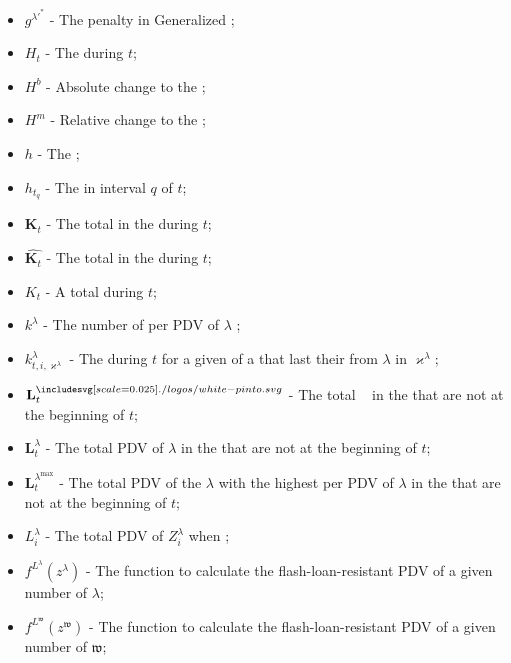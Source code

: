 \documentclass[class=article, crop=false]{standalone}
\begin{document}
\begin{itemize}[topsep=0pt, itemsep=3pt,leftmargin=16pt]
    \item[] $g^{\lambda'^{*}}$ - The  penalty in Generalized ;
    \item[] $H_{t}$ - The  during $t$;
    \item[] $H^{b}$ - Absolute change to the ;
    \item[] $H^{m}$ - Relative change to the ;
    \item[] $h$ - The ;
    \item[] $h_{t_{q}}$ - The  in interval $q$ of $t$;
    \item[] $\mathbf{K}_{t}$ - The total  in the  during $t$;
    \item[] $\widehat{\mathbf{K}_{t}}$ - The total  in the  during $t$;
    \item[] $K_{t}$ - A  total  during $t$;
    \item[] $k^{\lambda}$ - The number of  per PDV of $\lambda$ ;
    \item[] $k_{t,i,\varkappa^{\lambda}}^{\lambda}$ - The  during $t$ for a given  of a  that last  their  from $\lambda$  in $\varkappa^{\lambda}$;
    \item[] $\mathbf{L}_{t}^{\pinto}$ - The total \Pinto\  in the  that are not  at the beginning of $t$;
    \item[] $\mathbf{L}_{t}^{\lambda}$ - The total PDV of $\lambda$  in the  that are not  at the beginning of $t$;
    \item[] $\mathbf{L}_{t}^{\lambda^{\text{max}}}$ - The total PDV of the $\lambda$ with the highest  per PDV of $\lambda$  in the  that are not  at the beginning of $t$;
    \item[] $L_{i}^{\lambda}$ - The total PDV of $Z_{i}^{\lambda}$ when ;
    \item[] $f^{L^{\lambda}}(z^{\lambda})$ - The function to calculate the flash-loan-resistant PDV of a given number of  $\lambda$;
    \item[] $f^{L^{\mathfrak{w}}}(z^{\mathfrak{w}})$ - The function to calculate the flash-loan-resistant PDV of a given number of  $\mathfrak{w}$;

\end{itemize}
\end{document}
